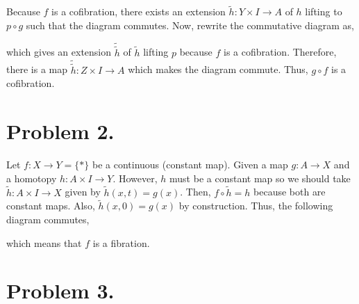 \documentclass[12pt]{extarticle}
\begin{document}
Because $f$ is a cofibration, there exists an extension $\tilde{h} : Y \times I \to A$ of $h$ lifting to $p \circ g$ such that the diagram commutes. Now, rewrite the commutative diagram as,
\begin{center}
\end{center} 
which gives an extension $\tilde{\tilde{h}}$ of $\tilde{h}$ lifting $p$ because $f$ is a cofibration. Therefore, there is a map $\tilde{\tilde{h}} : Z \times I \to A$ which makes the diagram commute. Thus, $g \circ f$ is a cofibration.

\section*{Problem 2.}

Let $f : X \to Y = \{ * \}$ be a continuous (constant map). Given a map $g : A \to X$ and a homotopy $h : A \times I \to Y$. However, $h$ must be a constant map so we should take $\tilde{h} : A \times I \to X$ given by $\tilde{h}(x, t) = g(x)$. Then, $f \circ \tilde{h} = h$ because both are constant maps. Also, $\tilde{h}(x, 0) = g(x)$ by construction. Thus, the following diagram commutes,
\begin{center}
\end{center} 
which means that $f$ is a fibration.

\section*{Problem 3.}
\end{document}
